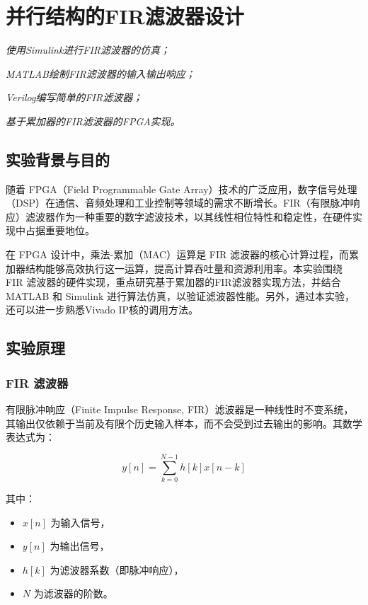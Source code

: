 \chapter{并行结构的FIR滤波器设计}
\begin{introduction}
  \item \textit{使用Simulink进行FIR滤波器的仿真；}
  \item \textit{MATLAB绘制FIR滤波器的输入输出响应；}
  \item \textit{Verilog编写简单的FIR滤波器；}
  \item \textit{基于累加器的FIR滤波器的FPGA实现。}
\end{introduction}
\section{实验背景与目的}
随着 FPGA（Field Programmable Gate Array）技术的广泛应用，数字信号处理（DSP）在通信、音频处理和工业控制等领域的需求不断增长。FIR（有限脉冲响应）滤波器作为一种重要的数字滤波技术，以其线性相位特性和稳定性，在硬件实现中占据重要地位。

在 FPGA 设计中，乘法-累加（MAC）运算是 FIR 滤波器的核心计算过程，而累加器结构能够高效执行这一运算，提高计算吞吐量和资源利用率。本实验围绕 FIR 滤波器的硬件实现，重点研究基于累加器的FIR滤波器实现方法，并结合 MATLAB 和 Simulink 进行算法仿真，以验证滤波器性能。另外，通过本实验，还可以进一步熟悉Vivado IP核的调用方法。

\section{实验原理}

\subsection{FIR 滤波器}

有限脉冲响应（Finite Impulse Response, FIR）滤波器是一种线性时不变系统，其输出仅依赖于当前及有限个历史输入样本，而不会受到过去输出的影响。其数学表达式为：

\begin{equation}
    y[n] = \sum_{k=0}^{N-1} h[k] x[n-k]
\end{equation}

其中：
\begin{itemize}
    \item $x[n]$ 为输入信号，
    \item $y[n]$ 为输出信号，
    \item $h[k]$ 为滤波器系数（即脉冲响应），
    \item $N$ 为滤波器的阶数。
\end{itemize}

